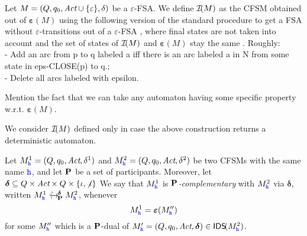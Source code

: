 \begin{definition}
Let $M=(Q,q_0,\textit{Act}\cup\{\varepsilon\},\delta)$ be a $\varepsilon$-FSA.
We define $\mathcal{I}\!(M)$ as the CFSM obtained out of $\bm{\varepsilon}(M)$ 
using the following version of the standard procedure to get a FSA without $\varepsilon$-transitions
out of a $\varepsilon$-FSA \cite{sipser96}, where final states are not taken into account and
the set of states of $\mathcal{I}\!(M)$ and $\bm{\varepsilon}(M)$ stay the same . 
Roughly:\\ 
- Add an arc from p to q labeled a iff there is an arc labeled a in N from some state in eps-CLOSE(p) to q.;\\
- Delete all arcs labeled with epsilon.
\end{definition}
Mention the fact that we can take any automaton having some specific property w.r.t. $\bm{\varepsilon}(M)$.

We consider $\mathcal{I}\!(M)$ defined only in case the above construction returns a deterministic automaton.

\begin{definition}
Let $M^1_{\mathtt{\color{blue}{ {h}}}} = (Q, q_0, \textit{Act}, \delta^1)$ and 
$M^2_{\mathtt{\color{blue}{ {h}}}} = (Q, q_0, \textit{Act}, \delta^2)$  
be two CFSMs with the same name ${\mathtt{\color{blue}{ {h}}}}$, and let $\mathbf{P}$ be a set of participants.
Moreover, let $\bm{\delta} \subseteq Q\times\textit{Act}\times Q \times \{\iota,\not\iota\}$
We say that
$M^1_{\mathtt{\color{blue}{ {h}}}}$ is {\em $\mathbf{P}$-complementary} with $M^2_{\mathtt{\color{blue}{ {h}}}}$ via $\bm{\delta}$, written $M^1_{\mathtt{\color{blue}{ {h}}}}\ \,{^{\mbox{\tiny $?$}}_{\mbox{\tiny $!$}}\hspace{-8pt}\hookrightarrow_{\!\mathbf{P}\,\,}^{\!\bm{\delta}\,\,}}M^2_{\mathtt{\color{blue}{ {h}}}}$, whenever 
$$M^1_{\mathtt{\color{blue}{ {h}}}} = \bm{\varepsilon}(M''_{\mathtt{\color{blue}{ {h}}}})$$
for some $M''_{\mathtt{\color{blue}{ {h}}}}$ which is a $\mathbf{P}$-dual of $M'_{\mathtt{\color{blue}{ {h}}}}= (Q, q_0, \textit{Act}, \bm{\delta})\in\mathsf{IDS}\!(M^2_{\mathtt{\color{blue}{ {h}}}})$.
\end{definition}

